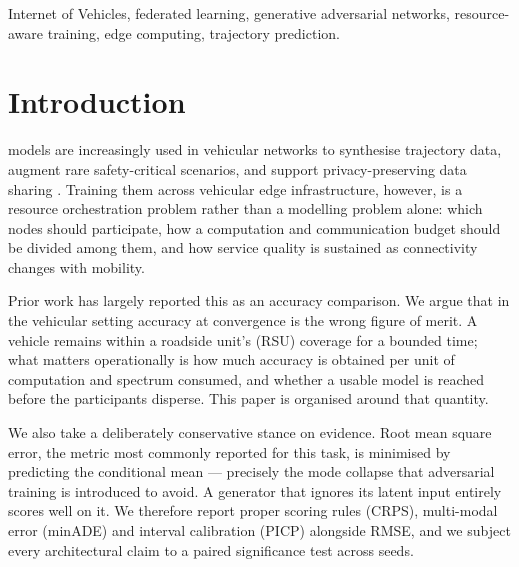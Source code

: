 \documentclass[journal]{IEEEtran}
\begin{document}
\begin{IEEEkeywords}
Internet of Vehicles, federated learning, generative adversarial networks,
resource-aware training, edge computing, trajectory prediction.
\end{IEEEkeywords}

\section{Introduction}
 models are increasingly used in vehicular networks
to synthesise trajectory data, augment rare safety-critical scenarios, and
support privacy-preserving data sharing \cite{devika2024vadgan,luo2025wgan}.
Training them across vehicular edge infrastructure, however, is a resource
orchestration problem rather than a modelling problem alone: which nodes should
participate, how a computation and communication budget should be divided among
them, and how service quality is sustained as connectivity changes with
mobility.

Prior work has largely reported this as an accuracy comparison. We argue that
in the vehicular setting accuracy at convergence is the wrong figure of merit.
A vehicle remains within a roadside unit's (RSU) coverage for a bounded time;
what matters operationally is how much accuracy is obtained per unit of
computation and spectrum consumed, and whether a usable model is reached before
the participants disperse. This paper is organised around that quantity.

We also take a deliberately conservative stance on evidence. Root mean square
error, the metric most commonly reported for this task, is minimised by
predicting the conditional mean --- precisely the mode collapse that adversarial
training is introduced to avoid. A generator that ignores its latent input
entirely scores well on it. We therefore report proper scoring rules (CRPS),
multi-modal error (minADE) and interval calibration (PICP) alongside RMSE, and
we subject every architectural claim to a paired significance test across seeds.
\end{document}
